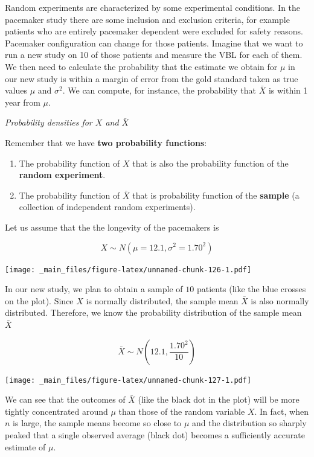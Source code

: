 \documentclass[
]{book}
\begin{document}
Random experiments are characterized by some experimental conditions. In the pacemaker study there are some inclusion and exclusion criteria, for example patients who are entirely pacemaker dependent were excluded for safety reasons. Pacemaker configuration can change for those patients. Imagine that we want to run a new study on 10 of those patients and measure the VBL for each of them. We then need to calculate the probability that the estimate we obtain for \(\mu\) in our new study is within a margin of error from the gold standard taken as true values \(\mu\) and \(\sigma^2\). We can compute, for instance, the probability that \(\bar{X}\) is within 1 year from \(\mu\).

\emph{Probability densities for \(X\) and \(\bar{X}\)}

Remember that we have \textbf{two probability functions}:

\begin{enumerate}
\def\labelenumi{\arabic{enumi}.}
\item
  The probability function of \(X\) that is also the probability function of the \textbf{random experiment}.
\item
  The probability function of \(\bar{X}\) that is probability function of the \textbf{sample} (a collection of independent random experiments).
\end{enumerate}

Let us assume that the the longevity of the pacemakers is

\[X \sim N(\mu=12.1, \sigma^2=1.70^2)\]

\texttt{[image: \_main\_files/figure-latex/unnamed-chunk-126-1.pdf]}

In our new study, we plan to obtain a sample of \(10\) patients (like the blue crosses on the plot). Since \(X\) is normally distributed, the sample mean \(\bar{X}\) is also normally distributed. Therefore, we know the probability distribution of the sample mean \(\bar{X}\)

\[\bar{X} \sim N(12.1 , \frac{1.70^2}{10})\]

\texttt{[image: \_main\_files/figure-latex/unnamed-chunk-127-1.pdf]}

We can see that the outcomes of \(\bar{X}\) (like the black dot in the plot) will be more tightly concentrated around \(\mu\) than those of the random variable \(X\). In fact, when \(n\) is large, the sample means become so close to \(\mu\) and the distribution so sharply peaked that a single observed average (black dot) becomes a sufficiently accurate estimate of \(\mu\).
\end{document}

